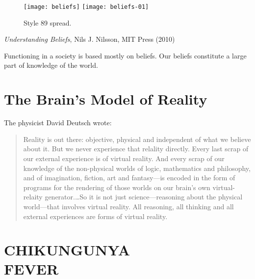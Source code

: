 \begin{figure}[ht]
\centering
\texttt{[image: beliefs]}%
\texttt{[image: beliefs-01]}
\caption{Style 89 spread.}
\end{figure}

\emph{Understanding Beliefs}, Nils J. Nilsson, MIT Press (2010)

Functioning in a society is based mostly on beliefs. Our beliefs constitute a large part of knowledge of the world.



\chapter{The Brain’s Model of Reality}

The physicist David Deutsch wrote:
\begin{quotation}
Reality is out there: objective, physical and independent of what we believe about it. But we never experience that relality directly. Every last scrap of our external experience is of virtual reality. And every scrap of our knowledge of the non-physical worlds of logic, mathematics and philosophy, and of imagination, fiction, art and fantasy---is encoded in the form of programs for the rendering of those worlds on our brain’s own virtual-relaity generator.\ldots So it is not just science---reasoning about the physical world---that involves virtual reality. All reasoning, all thinking and all external experiences are forms of virtual reality.
\end{quotation}

\chapter[Chikungunya Fever]{CHIKUNGUNYA\\FEVER}




